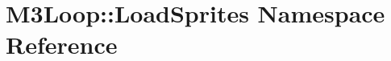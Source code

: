 \hypertarget{namespaceM3Loop_1_1LoadSprites}{}\section{M3\+Loop\+:\+:Load\+Sprites Namespace Reference}
\label{namespaceM3Loop_1_1LoadSprites}
